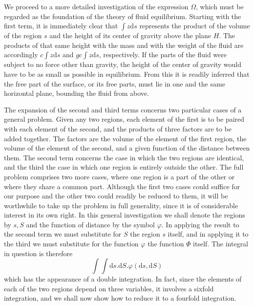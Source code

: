 We proceed to a more detailed investigation of the expression $\Omega$, which must be regarded as the foundation of the theory of fluid equilibrium. Starting with the first term, it is immediately clear that $\int z\mathrm{d}s$ represents the product of the volume of the region $s$ and the height of its center of gravity above the plane $H$. The products of that same height with the mass and with the weight of the fluid are accordingly $c\int z\mathrm{d}s$ and $gc\int z\mathrm{d}s$, respectively. If the parts of the fluid were subject to no force other than gravity, the height of the center of gravity would have to be as small as possible in equilibrium. From this it is readily inferred that the free part of the surface, or its free parts, must lie in one and the same horizontal plane, bounding the fluid from above.

The expansion of the second and third terms concerns two particular cases of a general problem. Given any two regions, each element of the first is to be paired with each element of the second, and the products of three factors are to be added together. The factors are the volume of the element of the first region, the volume of the element of the second, and a given function of the distance between them. The second term concerns the case in which the two regions are identical, and the third the case in which one region is entirely outside the other. The full problem comprises two more cases, where one region is a part of the other or where they share a common part. Although the first two cases could suffice for our purpose and the other two could readily be reduced to them, it will be worthwhile to take up the problem in full generality, since it is of considerable interest in its own right. In this general investigation we shall denote the regions by $s,S$ and the function of distance by the symbol $\varphi$. In applying the result to the second term we must substitute for $S$ the region $s$ itself, and in applying it to the third we must substitute for the function $\varphi$ the function $\Phi$ itself. The integral in question is therefore
\[
\int\int\mathrm{d}s.\mathrm{d}S.\varphi(\mathrm{d}s,\mathrm{d}S)
\]
which has the appearance of a double integration. In fact, since the elements of each of the two regions depend on three variables, it involves a sixfold integration, and we shall now show how to reduce it to a fourfold integration.


